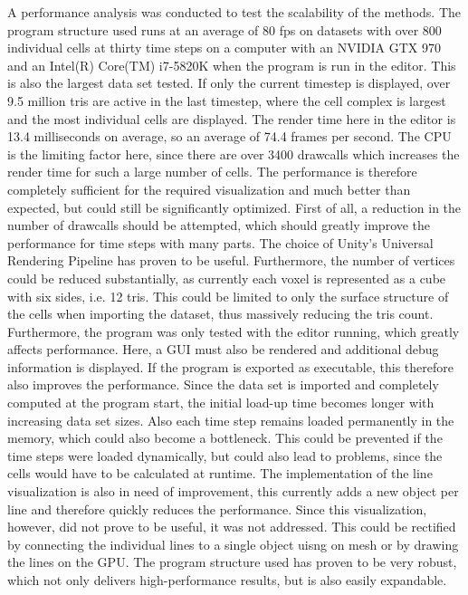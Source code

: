 A performance analysis was conducted to test the scalability of the methods. The program structure used runs at an average of 80 fps on datasets with over 800 individual cells at thirty time steps on a computer with an NVIDIA GTX 970 and an Intel(R) Core(TM) i7-5820K when the program is run in the editor. This is also the largest data set tested. If only the current timestep is displayed, over 9.5 million tris are active in the last timestep, where the cell complex is largest and the most individual cells are displayed. The render time here in the editor is 13.4 milliseconds on average, so an average of 74.4 frames per second. The CPU is the limiting factor here, since there are over 3400 drawcalls which increases the render time for such a large number of cells.
The performance is therefore completely sufficient for the required visualization and much better than expected, but could still be significantly optimized. First of all, a reduction in the number of drawcalls should be attempted, which should greatly improve the performance for time steps with many parts. The choice of Unity's Universal Rendering Pipeline has proven to be useful. Furthermore, the number of vertices could be reduced substantially, as currently each voxel is represented as a cube with six sides, i.e. 12 tris.
This could be limited to only the surface structure of the cells when importing the dataset, thus massively reducing the tris count. Furthermore, the program was only tested with the editor running, which greatly affects performance. Here, a GUI must also be rendered and additional debug information is displayed. If the program is exported as executable, this therefore also improves the performance. Since the data set is imported and completely computed at the program start, the initial load-up time becomes longer with increasing data set sizes. Also each time step remains loaded permanently in the memory, which could also become a bottleneck. This could be prevented if the time steps were loaded dynamically, but could also lead to problems, since the cells would have to be calculated at runtime. The implementation of the line visualization is also in need of improvement, this currently adds a new object per line and therefore quickly reduces the performance. Since this visualization, however, did not prove to be useful, it was not addressed. This could be rectified by connecting the individual lines to a single object uisng on mesh or by drawing the lines on the GPU. The program structure used has proven to be very robust, which not only delivers high-performance results, but is also easily expandable.